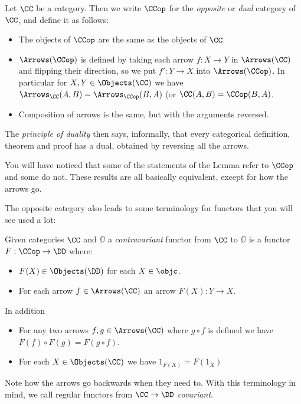 \begin{defn}
Let $\CC$ be a category. Then we write $\CCop$ for the {\it opposite} or {\it dual}
category of $\CC$, and define it as follows:
\begin{itemize}
\item The objects of $\CCop$ are the same as the objects of $\CC$.
\item $\Arrows(\CCop)$ is defined by taking each arrow $f :X \to Y$ in $\Arrows(\CC)$ and
flipping their direction, so we put $f': Y \to X$ into $\Arrows(\CCop)$. In particular for
$X, Y \in \Objects(\CC)$ we have $\Arrows_{\CC}(A, B) = \Arrows_{\CCop}(B, A)$ (or $\CC(A,
B) = \CCop(B, A)$.
\item Composition of arrows is the same, but with the arguments reversed.
\end{itemize}
\end{defn}
\noindent
The {\it principle of duality} then says, informally, that every categorical definition,
theorem and proof has a dual, obtained by reversing all the arrows.

You will have noticed that some of the statements of the Lemma refer to $\CCop$ and some
do not. These results are all basically equivalent, except for how the arrows go.

The opposite category also leads to some terminology for functors that you will see used a
lot:

\begin{defn}
Given categories $\CC$ and $\DD$ a {\it contravariant} functor from $\CC$ to $\DD$ is a
functor $F: \CCop \to \DD$ where:
\begin{itemize}
\item $F(X) \in \Objects(\DD)$ for each $X \in \objc$.
\item For each arrow $f \in \Arrows(\CC)$ an arrow $F(X): Y \to X$.
\end{itemize}
\goodbreak
\noindent
In addition
\begin{itemize}
\item For any two arrows $f, g \in \Arrows(\CC)$ where $g \circ f$ is defined we have
$F(f) \circ F(g) = F(g \circ f)$.
\item For each $X \in \Objects(\CC)$ we have $1_{F(X)} = F(1_X)$
\end{itemize}

\end{defn}
\noindent
Note how the arrows go backwards when they need to. With this terminology in mind, we call
regular functors from $\CC \to \DD$ {\it covariant}.


